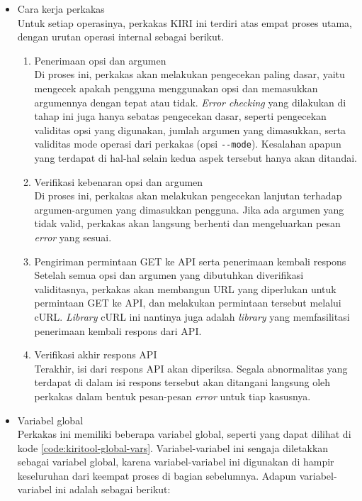 \begin{itemize}[listparindent=\parindent]
	\item Cara kerja perkakas \\
	Untuk setiap operasinya, perkakas \cl KIRI ini terdiri atas empat proses utama, dengan urutan operasi internal sebagai berikut.
	
	\begin{enumerate}
		\item Penerimaan opsi dan argumen \\
		Di proses ini, perkakas akan melakukan pengecekan paling dasar, yaitu mengecek apakah pengguna menggunakan opsi dan memasukkan argumennya dengan tepat atau tidak. \textit{Error checking} yang dilakukan di tahap ini juga hanya sebatas pengecekan dasar, seperti pengecekan validitas opsi yang digunakan, jumlah argumen yang dimasukkan, serta validitas mode operasi dari perkakas (opsi \verb|--mode|). Kesalahan apapun yang terdapat di hal-hal selain kedua aspek tersebut hanya akan ditandai.
		\item Verifikasi kebenaran opsi dan argumen \\
		Di proses ini, perkakas akan melakukan pengecekan lanjutan terhadap argumen-argumen yang dimasukkan pengguna. Jika ada argumen yang tidak valid, perkakas akan langsung berhenti dan mengeluarkan pesan \textit{error} yang sesuai.
		\item Pengiriman permintaan GET ke API serta penerimaan kembali respons\\
		Setelah semua opsi dan argumen yang dibutuhkan diverifikasi validitasnya, perkakas akan membangun URL yang diperlukan untuk permintaan GET ke API, dan melakukan permintaan tersebut melalui cURL. \textit{Library} cURL ini nantinya juga adalah \textit{library} yang memfasilitasi penerimaan kembali respons dari API.
		\item Verifikasi akhir respons API \\
		Terakhir, isi dari respons API akan diperiksa. Segala abnormalitas yang terdapat di dalam isi respons tersebut akan ditangani langsung oleh perkakas dalam bentuk pesan-pesan \textit{error} untuk tiap kasusnya.
	\end{enumerate}
	
	\item Variabel global \\
	Perkakas ini memiliki beberapa variabel global, seperti yang dapat dilihat di kode \ref{code:kiritool-global-vars}. Variabel-variabel ini sengaja diletakkan sebagai variabel global, karena variabel-variabel ini digunakan di hampir keseluruhan dari keempat proses di bagian sebelumnya. Adapun variabel-variabel ini adalah sebagai berikut:
	

\end{itemize}
